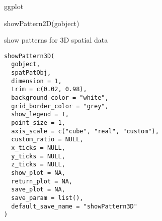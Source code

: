 \documentclass[a4paper]{book}
\begin{document}
%
\begin{Value}
ggplot
\end{Value}
%
\begin{Examples}
\begin{ExampleCode}
    showPattern2D(gobject)
\end{ExampleCode}
\end{Examples}
%
\begin{Description}\relax
show patterns for 3D spatial data
\end{Description}
%
\begin{Usage}
\begin{verbatim}
showPattern3D(
  gobject,
  spatPatObj,
  dimension = 1,
  trim = c(0.02, 0.98),
  background_color = "white",
  grid_border_color = "grey",
  show_legend = T,
  point_size = 1,
  axis_scale = c("cube", "real", "custom"),
  custom_ratio = NULL,
  x_ticks = NULL,
  y_ticks = NULL,
  z_ticks = NULL,
  show_plot = NA,
  return_plot = NA,
  save_plot = NA,
  save_param = list(),
  default_save_name = "showPattern3D"
)
\end{verbatim}
\end{Usage}
%
\end{document}
